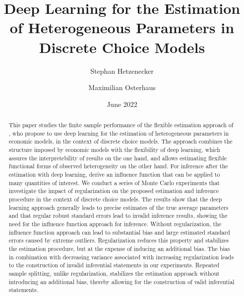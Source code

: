 \documentclass[a4paper, 12pt]{article}
\begin{document}
\begin{titlingpage}
	
	
	
\title{Deep Learning for the Estimation of Heterogeneous Parameters in Discrete Choice Models}	
	
\author[$a$]{Stephan Hetzenecker}
\author[$b$]{Maximilian Osterhaus}
	
	
\date{June 2022}
	
	
	
	
	
\maketitle
	
	
\begin{abstract}
		
		
This paper studies the finite sample performance of the flexible estimation approach of , who propose to use deep learning for the estimation of heterogeneous parameters in economic models, in the context of discrete choice models. The approach combines the structure imposed by economic models with the flexibility of deep learning, which assures the interpretebility of results on the one hand, and allows estimating flexible functional forms of observed heterogeneity on the other hand. For inference after the estimation with deep learning,  derive an influence function that can be applied to many quantities of interest. We conduct a series of Monte Carlo experiments that investigate the impact of regularization on the proposed estimation and inference procedure in the context of discrete choice models.
The results show that the deep learning approach generally leads to precise estimates of the true average parameters and that regular robust standard errors lead to invalid inference results, showing the need for the influence function approach for inference.
Without regularization, the influence function approach can lead to substantial bias and large estimated standard errors caused by extreme outliers. %
Regularization reduces this property and stabilizes the estimation procedure, but at the expense of inducing an additional bias. The bias in combination with decreasing variance associated with increasing regularization leads to %
the construction of invalid inferential statements in our experiments. 
Repeated sample splitting, unlike regularization, stabilizes the estimation approach without introducing an additional bias, thereby allowing for the construction of valid inferential statements. 


\end{abstract}
\end{titlingpage}
\end{document}
